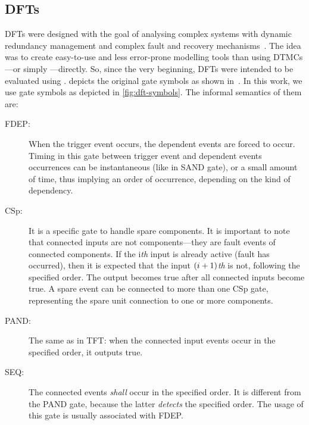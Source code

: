 \documentclass[12pt,openright,twoside,a4paper,oldfontcommands,english,brazil,final]{abntex2}
\theoremstyle{theo}
\newcommand{\parsin}[1]{\ensuremath\left( #1 \right)}
\begin{document}
\subsection{\Aclp*{DFT}}
\label{sec:dynamic-fault-trees}

\begin{sloppypar}
\Aclp{DFT} were designed with the goal of analysing complex systems with dynamic redundancy management and complex fault and recovery mechanisms~\cite{DBB1992}.
The idea was to create easy-to-use and less error-prone modelling tools than using \acp{DTMC}---or simply \emph{}---directly.
So, since the very beginning, \acp{DFT} were intended to be evaluated using .
 depicts the original gate symbols as shown in~\cite{DBB1992,Boyd1992}.
In this work, we use gate symbols as depicted in \cref{fig:dft-symbols}.
The informal semantics of them are:
%
\begin{description}
  \item[\Ac{FDEP}:]
  When the trigger event occurs, the dependent events are forced to occur.
  Timing in this gate between trigger event and dependent events occurrences can be instantaneous (like in  \ac{SAND} gate), or a small amount of time, thus implying an order of occurrence, depending on the kind of dependency.
  \item[\Ac{CSp}:]
  It is a specific gate to handle spare components.
  It is important to note that connected inputs are not components---they are fault events of connected components.
  If the i\emph{th} input is already active (fault has occurred), then it is expected that the input $\parsin{i+1}$\emph{th} is not, following the specified order.
  The output becomes true after all connected inputs become true.
  A spare event can be connected to more than one \ac{CSp} gate, representing the spare unit connection to one or more components.
  \item[\ac{PAND}:]
  The same as in \ac{TFT}: when the connected input events occur in the specified order, it outputs true.
  \item[\Ac{SEQ}:]
  The connected events \emph{shall} occur in the specified order.
  It is different from the \ac{PAND} gate, because the latter \emph{detects} the specified order.
  The usage of this gate is usually associated with \ac{FDEP}.
\end{description}
\end{sloppypar}
\end{document}
